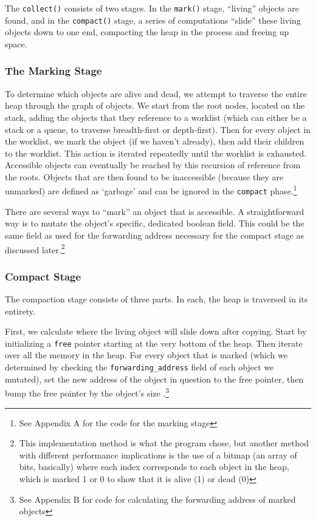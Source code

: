 \documentclass[index]{subfiles}
\begin{document}
The \verb+collect()+ consists of two stages. In the \verb+mark()+ stage, ``living'' objects are found, and in the \verb+compact()+ stage, a series of computations ``slide'' these living objects down to one end, compacting the heap in the process and freeing up space\cite[Chapter~3]{gc_handbook}.

\subsubsection{The Marking Stage}

To determine which objects are alive and dead, we attempt to traverse the entire heap through the graph of objects. We start from the root nodes, located on the stack\cites[Ch~3~Marking]{redhat_openjdk}[Chapter~3]{gc_handbook}, adding the objects that they reference to a worklist (which can either be a stack or a queue, to traverse breadth-first or depth-first). Then for every object in the worklist, we mark the object (if we haven't already), then add their children to the worklist. This action is iterated repeatedly until the worklist is exhausted. Accessible objects can eventually be reached by this recursion of reference from the roots. Objects that are then found to be inaccessible (because they are unmarked) are defined as `garbage' and can be ignored in the \verb+compact+ phase.\footnote{See Appendix A for the code for the marking stage}

There are several ways to ``mark'' an object that is accessible\cite[Chapter~3]{gc_handbook}. A straightforward way is to mutate the object's specific, dedicated boolean field. This could be the same field as used for the forwarding address necessary for the compact stage as discussed later\cite[Chapter~1]{gc_handbook}.\footnote{This implementation method is what the program chose, but another method with different performance implications is the use of a bitmap (an array of bits, basically) where each index corresponds to each object in the heap, which is marked 1 or 0 to show that it is alive (1) or dead (0)\cite[Chapter~3]{gc_handbook}}

\subsubsection{Compact Stage}

The compaction stage consists of three parts. In each, the heap is traversed in its entirety.

First, we calculate where the living object will slide down after copying. Start by initializing a \verb+free+ pointer starting at the very bottom of the heap. Then iterate over all the memory in the heap. For every object that is marked (which we determined by checking the \verb+forwarding_address+ field of each object we mutated), set the new address of the object in question to the free pointer, then bump the free pointer by the object's size \cites[Chapter~3]{gc_handbook}[Sections~3.3--3.5]{redhat_openjdk}.\footnote{See Appendix B for code for calculating the forwarding address of marked objects}
\end{document}
